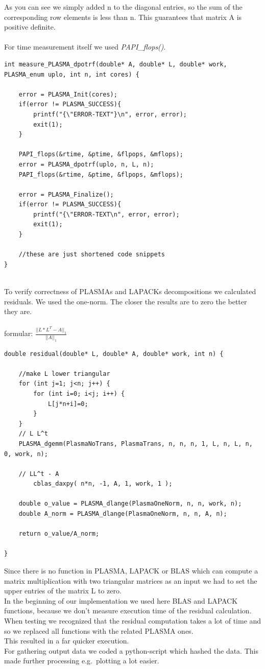 \documentclass[a4paper,final,ngerman,english]{article}
\begin{document}
As you can see we simply added n to the diagonal entries, so the sum of the corresponding row elements is less than n. This guarantees that matrix A is positive definite.\\
\ \\
For time measurement itself we used \textit{PAPI\_flops()}.
\begin{lstlisting}
int measure_PLASMA_dpotrf(double* A, double* L, double* work, PLASMA_enum uplo, int n, int cores) {

	error = PLASMA_Init(cores);
	if(error != PLASMA_SUCCESS){
		printf("{\"ERROR-TEXT"}\n", error, error);
		exit(1);
	}

	PAPI_flops(&rtime, &ptime, &flpops, &mflops);
	error = PLASMA_dpotrf(uplo, n, L, n);
	PAPI_flops(&rtime, &ptime, &flpops, &mflops);

	error = PLASMA_Finalize();
	if(error != PLASMA_SUCCESS){
		printf("{\"ERROR-TEXT\n", error, error);
		exit(1);
	}
	
	//these are just shortened code snippets
}
\end{lstlisting}
\ \\
To verify correctness of PLASMAs and LAPACKs decompositions we calculated residuals.
We used the one-norm. The closer the results are to zero the better they are.\\
\ \\
formular:
\(\frac{||L*L^T-A||_1}{||A||_1}\)\\


\begin{lstlisting}
double residual(double* L, double* A, double* work, int n) {

	//make L lower triangular
	for (int j=1; j<n; j++) {
		for (int i=0; i<j; i++) {
			L[j*n+i]=0;
		}
	}
	// L L^t
	PLASMA_dgemm(PlasmaNoTrans, PlasmaTrans, n, n, n, 1, L, n, L, n, 0, work, n);

	// LL^t - A
    	cblas_daxpy( n*n, -1, A, 1, work, 1 );

	double o_value = PLASMA_dlange(PlasmaOneNorm, n, n, work, n);
	double A_norm = PLASMA_dlange(PlasmaOneNorm, n, n, A, n);

	return o_value/A_norm;

}
\end{lstlisting}
Since there is no function in PLASMA, LAPACK or BLAS which can compute a matrix multiplication with two triangular matrices as an input we had to set the upper entries of the matrix L to zero.\\
In the beginning of our implementation we used here BLAS and LAPACK functions, because we don't measure execution time of the residual calculation. When testing we recognized that the residual computation takes a lot of time and so we replaced all functions with the related PLASMA ones.\\
This resulted in a far quicker execution.
\ \\
For gathering output data we coded a python-script which hashed the data. This made further processing e.g.\ plotting a lot easier.
\end{document}
